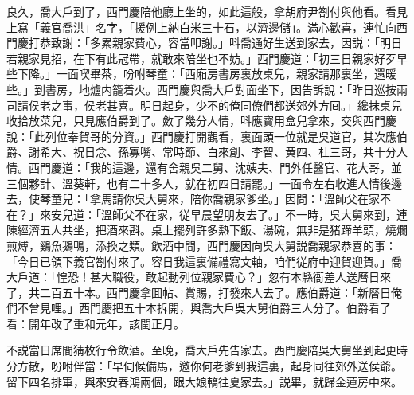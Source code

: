 良久，喬大戶到了，西門慶陪他廳上坐的，如此這般，拿胡府尹劄付與他看。看見上寫「義官喬洪」名字，「援例上納白米三十石，以濟邊儲」。滿心歡喜，連忙向西門慶打恭致謝：「多累親家費心，容當叩謝。」呌喬通好生送到家去，因説：「明日若親家見招，在下有此冠帶，就敢來陪坐也不妨。」西門慶道：「初三日親家好歹早些下降。」一面喫畢茶，吩咐琴童：「西廂房書房裏放桌兒，親家請那裏坐，還暖些。」到書房，地爐内籠着火。西門慶與喬大戶對面坐下，因告訴說：「昨日巡按兩司請侯老之事，侯老甚喜。明日起身，少不的俺同僚們都送郊外方囘。」纔抹桌兒收拾放菜兒，只見應伯爵到了。斂了幾分人情，呌應寳用盒兒拿來，交與西門慶說：「此列位奉賀哥的分資。」西門慶打開觀看，裏面頭一位就是吳道官，其次應伯爵、謝希大、祝日念、孫寡嘴、常時節、白來創、李智、黄四、杜三哥，共十分人情。西門慶道：「我的這邊，還有舍親吳二舅、沈姨夫、門外任醫官、花大哥，並三個夥計、溫葵軒，也有二十多人，就在初四日請罷。」一面令左右收進人情後邊去，使琴童兒：「拿馬請你吳大舅來，陪你喬親家爹坐。」因問：「溫師父在家不在？」來安兒道：「溫師父不在家，従早晨望朋友去了。」不一時，吳大舅來到，連陳經濟五人共坐，把酒來斟。桌上擺列許多熱下飯、湯碗，無非是猪蹄羊頭，燒爛煎煿，鷄魚鵝鴨，添換之類。飲酒中間，西門慶因向吳大舅説喬親家恭喜的事：「今日已領下義官劄付來了。容日我這裏備禮寫文軸，咱們従府中迎賀迎賀。」喬大戶道：「惶恐！甚大職役，敢起動列位親家費心？」忽有本縣衙差人送曆日來了，共二百五十本。西門慶拿囬帖、賞賜，打發來人去了。應伯爵道：「新曆日俺們不曾見哩。」西門慶把五十本拆開，與喬大戶吳大舅伯爵三人分了。伯爵看了看：開年改了重和元年，該閏正月。

不説當日席間猜枚行令飲酒。至晚，喬大戶先告家去。西門慶陪吳大舅坐到起更時分方散，吩咐伴當：「早伺候備馬，邀你何老爹到我這裏，起身同往郊外送侯爺。留下四名排軍，與來安春鴻兩個，跟大娘轎往夏家去。」説畢，就歸金蓮房中來。

